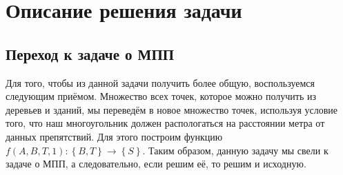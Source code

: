 \documentclass[12pt,a4paper]{article}
\begin{document}
\newpage

\section{Описание решения задачи} {
\subsection{Переход к задаче о МПП}
Для того, чтобы из данной задачи получить более общую, воспользуемся следующим приёмом. Множество всех точек, которое можно получить из деревьев и зданий, мы переведём в новое множество точек, используя условие того, что наш многоугольник должен распологаться на расстоянии метра от данных препятствий. Для этого построим функцию $f(A, B, T, 1) : \left\{B,T\right\} \rightarrow \left\{S\right\}$. Таким образом, данную задачу мы свели к задаче о МПП, а следовательно, если решим её, то решим и исходную.
}
\end{document}
